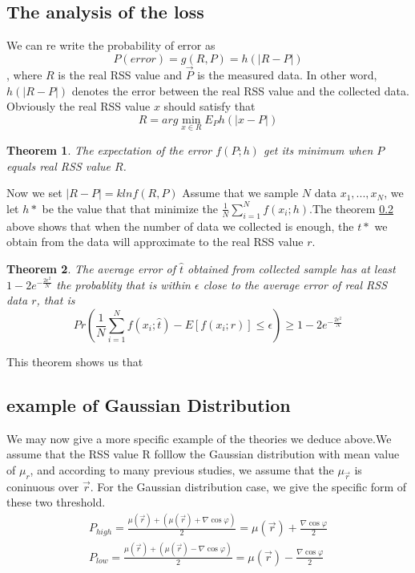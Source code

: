 \documentclass[10pt,conference,compsocconf,letterpaper]{IEEEtran}
\newtheorem{theorem}{Theorem}
\begin{document}
\subsection{The analysis of the loss}
We can re write the probability of error as 
\begin{equation}
P(error)=g(R,P)=h(|R-P|)
\end{equation}
, where $R$ is the real RSS value and $\vec P$ is the measured data. In other word, $h(|R-P|)$ denotes the error between the real RSS value and the collected data. Obviously the real RSS value $x$ should satisfy that 
\begin{equation}
R=arg\min_{x\in R}E_Ph(|x-P|)
\end{equation}
\begin{theorem}
The expectation of the error $f(P;h)$ get its minimum when $P$ equals real RSS value $R$. 
\end{theorem}
Now we set $|R-P|=klnf(R,P)$
Assume that we sample $N$ data $x_1,...,x_N$, we let $h*$ be the value that that minimize the $\frac{1}{N}\sum_{i=1}^N f(x_i;h)$.The theorem \ref{} above shows that when the number of data we collected is enough, the $t*$ we obtain from the data will approximate to the real RSS value $r$. 
\begin{theorem}
The average error of $\hat{t}$ obtained from collected sample has at least $1-2e^{-\frac{2\epsilon^2}{N}}$ the probablity that is within $\epsilon$ close to the average error of real RSS data $r$, that is
\begin{equation}
Pr(\frac{1}{N}\sum_{i=1}^Nf(x_i;\hat{t})-E[f(x_i;r)]\leq\epsilon)\geq1-2e^{-\frac{2\epsilon^2}{N}}
\end{equation}
\end{theorem}
This theorem shows us that
\subsection{example of Gaussian Distribution}
We may now give a more specific example of the theories we deduce above.We assume that the RSS value R folllow the Gaussian distribution with mean value of $\mu_{r}$, and according to many previous studies, we assume that the $\mu_{\vec r}$ is coninuous over $\vec r$.
For the Gaussian distribution case, we give the specific form of these two threshold.
\begin{equation}
\begin{aligned}
{P_{high}} = \frac{{\mu (\vec r) + (\mu (\vec r) + \nabla \cos \varphi )}}{2} = \mu (\vec r) + \frac{{\nabla \cos \varphi }}{2}\\
{P_{low}} = \frac{{\mu (\vec r) + (\mu (\vec r) - \nabla \cos \varphi )}}{2} = \mu (\vec r) - \frac{{\nabla \cos \varphi }}{2}
\end{aligned}
\end{equation}
\end{document}
